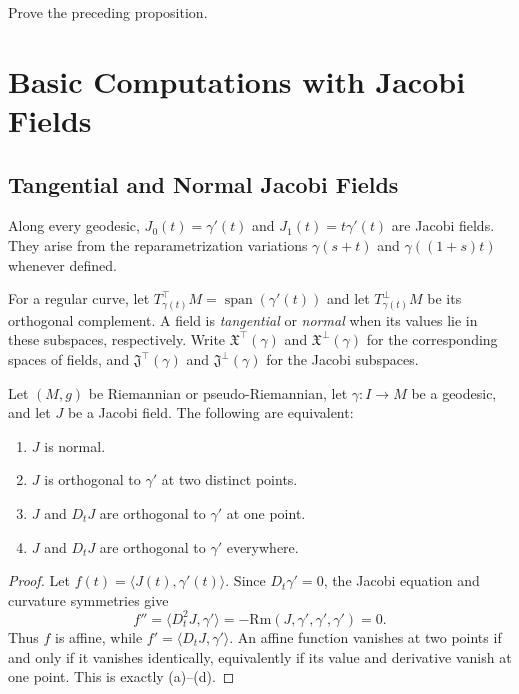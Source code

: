\begin{exercise}
\label{exer:prove-local-isometry-invariance}
Prove the preceding proposition.
\end{exercise}

\section{Basic Computations with Jacobi Fields}

\subsection{Tangential and Normal Jacobi Fields}

Along every geodesic, $J_0(t)=\gamma'(t)$ and $J_1(t)=t\gamma'(t)$ are Jacobi
fields.  They arise from the reparametrization variations
$\gamma(s+t)$ and $\gamma((1+s)t)$ whenever defined.

For a regular curve, let
$T^\top_{\gamma(t)}M=\operatorname{span}(\gamma'(t))$ and let
$T^\perp_{\gamma(t)}M$ be its orthogonal complement.  A field is
\emph{tangential} or \emph{normal} when its values lie in these subspaces,
respectively.  Write $\mathfrak X^\top(\gamma)$ and
$\mathfrak X^\perp(\gamma)$ for the corresponding spaces of fields, and
$\mathfrak J^\top(\gamma)$ and $\mathfrak J^\perp(\gamma)$ for the Jacobi
subspaces.

\begin{proposition}
\label{prop:normal-jacobi-equivalent-conditions}
Let $(M,g)$ be Riemannian or pseudo-Riemannian, let $\gamma:I\to M$ be a
geodesic, and let $J$ be a Jacobi field.  The following are equivalent:
\begin{enumerate}
\item[(a)] $J$ is normal.
\item[(b)] $J$ is orthogonal to $\gamma'$ at two distinct points.
\item[(c)] $J$ and $D_tJ$ are orthogonal to $\gamma'$ at one point.
\item[(d)] $J$ and $D_tJ$ are orthogonal to $\gamma'$ everywhere.
\end{enumerate}
\end{proposition}

\begin{proof}
\sketch
Let $f(t)=\langle J(t),\gamma'(t)\rangle$.  Since $D_t\gamma'=0$, the Jacobi
equation and curvature symmetries give
\[
f''=\langle D_t^2J,\gamma'\rangle
=-\mathrm{Rm}(J,\gamma',\gamma',\gamma')=0.
\]
Thus $f$ is affine, while
$f'=\langle D_tJ,\gamma'\rangle$.  An affine function vanishes at two points
if and only if it vanishes identically, equivalently if its value and
derivative vanish at one point.  This is exactly (a)--(d).
\end{proof}

